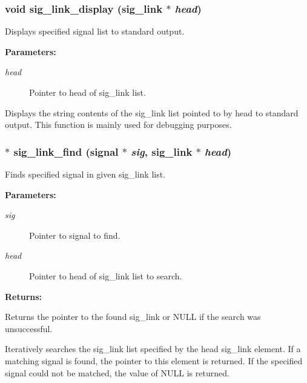 \subsubsection{\setlength{\rightskip}{0pt plus 5cm}void sig\_\-link\_\-display ({\bf sig\_\-link} $\ast$ {\em head})}\label{link_8h_a9}


Displays specified signal list to standard output.

\begin{Desc}
\item[{\bf Parameters: }]\par
\begin{description}
\item[
{\em head}]Pointer to head of sig\_\-link list.

\end{description}
\end{Desc}
Displays the string contents of the sig\_\-link list pointed to by head to standard output. This function is mainly used for debugging purposes. 
\subsubsection{$\ast$ sig\_\-link\_\-find ({\bf signal} $\ast$ {\em sig}, {\bf sig\_\-link} $\ast$ {\em head})}\label{link_8h_a14}


Finds specified signal in given sig\_\-link list.

\begin{Desc}
\item[{\bf Parameters: }]\par
\begin{description}
\item[
{\em sig}]Pointer to signal to find. \item[
{\em head}]Pointer to head of sig\_\-link list to search. \end{description}
\end{Desc}
\begin{Desc}
\item[{\bf Returns: }]\par
Returns the pointer to the found sig\_\-link or NULL if the search was unsuccessful.

\end{Desc}
Iteratively searches the sig\_\-link list specified by the head sig\_\-link element. If a matching signal is found, the pointer to this element is returned. If the specified signal could not be matched, the value of NULL is returned. 
